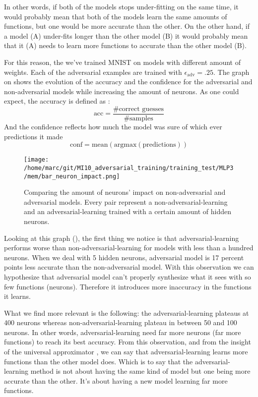 			In other words, if both of the models stops under-fitting on the same time, it would probably mean that both of the models learn the same amounts of functions, but one would be more accurate than the other. On the other hand, if a model (A) under-fits longer than the other model (B) it would probably mean that it (A) needs to learn more functions to accurate than the other model (B).

			For this reason, the we've trained MNIST on models with different amount of weights. Each of the adversarial examples are trained with $\epsilon_{\text{adv}} = .25$. The graph on  shows the evolution of the accuracy and the confidence for the adversarial and non-adversarial models while increasing the amount of neurons. As one could expect, the accuracy is defined as :
			$$\text{acc} = \frac{\text{\#correct guesses}}{\text{\#samples}}$$ 
			And the confidence reflects how much the model was sure of which ever predictions it made 
			$$\text{conf} =  \text{mean}( \text{argmax} (\text{predictions}))$$

			\begin{figure}
				\centering
				\texttt{[image: /home/marc/git/MI10\_adversarial\_training/training\_test/MLP3/mem/bar\_neuron\_impact.png]}
				\caption{Comparing the amount of neurons' impact on non-adversarial and adversarial models. Every pair represent a non-adversarial-learning and an adversarial-learning trained with a certain amount of hidden neurons.}
				\label{fig:mnist_neurons}
			\end{figure}
			
			Looking at this graph (), the first thing we notice is that adversarial-learning performs worse than non-adversarial-learning for models with less than a hundred neurons. When we deal with 5 hidden neurons, adversarial model is 17 percent points less accurate than the non-adversarial model. With this observation we can hypothesize that adversarial model can't properly synthesize what it sees with so few functions (neurons). Therefore it introduces more inaccuracy in the functions it learns.

			What we find more relevant is the following: the adversarial-learning plateaus at 400 neurons whereas non-adversarial-learning plateau in between 50 and 100 neurons. In other words, adversarial-learning need far more neurons (far more functions) to reach its best accuracy. From this observation, and from the insight of the universal approximator \cite{hornik1989multilayer}, we can say that adversarial-learning learns more functions than the other model does. Which is to say that the adversarial-learning method is not about having the same kind of model but one being more accurate than the other. It's about having a new model learning far more  functions. 

